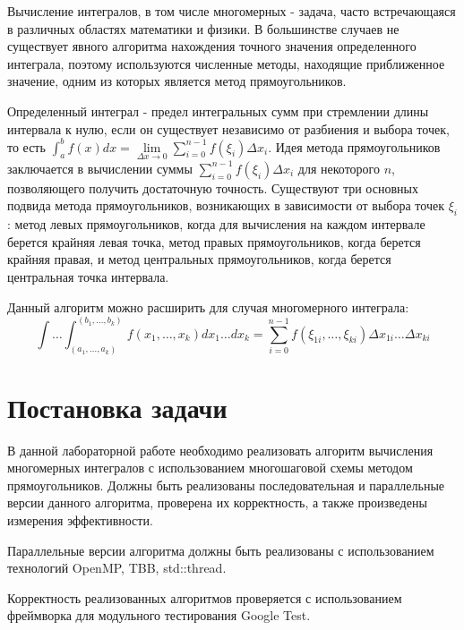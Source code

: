 \documentclass{report}
\begin{document}
\par Вычисление интегралов, в том числе многомерных - задача, часто встречающаяся в различных областях математики и физики. В большинстве случаев не существует явного алгоритма нахождения точного значения определенного интеграла, поэтому используются численные методы, находящие приближенное значение, одним из которых является метод прямоугольников.
\par Определенный интеграл - предел интегральных сумм при стремлении длины интервала к нулю, если он существует независимо от разбиения и выбора точек, то есть \( \int^{b}_{a} f(x)dx = \lim\limits_{\Delta x \to 0} \sum\limits_{i=0}^{n-1} f(\xi_i) \Delta x_i \). Идея метода прямоугольников заключается в вычислении суммы \( \sum\limits_{i=0}^{n-1} f(\xi_i) \Delta x_i \) для некоторого \(n\), позволяющего получить достаточную точность. Существуют три основных подвида метода прямоугольников, возникающих в зависимости от выбора точек \( \xi_i \): метод левых прямоугольников, когда для вычисления на каждом интервале берется крайняя левая точка, метод правых прямоугольников, когда берется крайняя правая, и метод центральных прямоугольников, когда берется центральная точка интервала.
\par Данный алгоритм можно расширить для случая многомерного интеграла: \[ \int \dots \int ^{(b_1, \dots , b_k)}_{(a_1, \dots , a_k)} f(x_1, \dots , x_k) dx_1 \dots dx_k = \sum\limits_{i=0}^{n-1} f(\xi_{1i}, \dots , \xi_{ki}) \Delta x_{1i} \dots \Delta x_{ki} \]

\clearpage

\section*{Постановка задачи}

\par В данной лабораторной работе необходимо реализовать алгоритм вычисления многомерных интегралов с использованием многошаговой схемы методом прямоугольников. Должны быть реализованы последовательная и параллельные версии данного алгоритма, проверена их корректность, а также произведены измерения эффективности.
\par Параллельные версии алгоритма должны быть реализованы с использованием технологий OpenMP, TBB, std::thread.
\par Корректность реализованных алгоритмов проверяется с использованием фреймворка для модульного тестирования Google Test.
\end{document}
